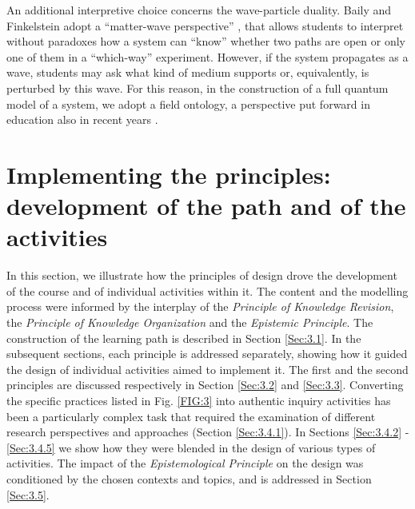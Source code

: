 \documentclass[twocolumn,secnumarabic,amssymb, nobibnotes, aps, prd, nofootinbib]{revtex4-2}
\begin{document}
An additional interpretive choice concerns the wave-particle duality. Baily and Finkelstein adopt a ``matter-wave perspective'' \cite{Baily2015}, that allows students to interpret without paradoxes how a system can ``know'' whether two paths are open or only one of them in a ``which-way'' experiment. However, if the system propagates as a wave, students may ask what kind of medium supports or, equivalently, is perturbed by this wave. For this reason, in the construction of a full quantum model of a system, we adopt a field ontology, a perspective put forward in education also in recent years \cite[e.g.,][]{Hobson2013}.\\

\centerline{}


\section{Implementing the principles: development of the path and of the activities}

In this section, we illustrate how the principles of design drove the development of the course and of individual activities within it. The content and the modelling process were informed by the interplay of the \textit{Principle of Knowledge Revision}, the \textit{Principle of Knowledge Organization} and the \textit{Epistemic Principle}.  The construction of the learning path is described in Section \ref{Sec:3.1}. In the subsequent sections, each principle is addressed separately, showing how it guided the design of individual activities aimed to implement it. The first and the second principles are discussed respectively in Section \ref{Sec:3.2} and \ref{Sec:3.3}. Converting the specific practices listed in Fig. \ref{FIG:3} into authentic inquiry activities has been a particularly complex task that required the examination of different research perspectives and approaches (Section \ref{Sec:3.4.1}). In Sections \ref{Sec:3.4.2} - \ref{Sec:3.4.5} we show how they were blended in the design of various types of activities. The impact of the \textit{Epistemological Principle} on the design was conditioned by the chosen contexts and topics, and is addressed in Section \ref{Sec:3.5}.
\end{document}
